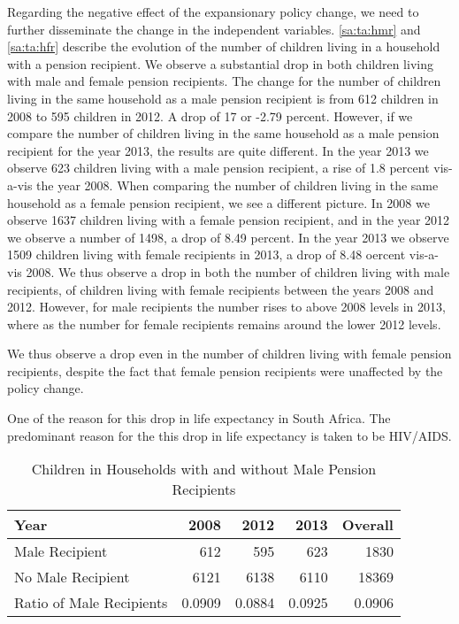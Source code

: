 \begin{refsection}
Regarding the negative effect of the expansionary policy change, we need to further disseminate the change in the independent variables.
\autoref{sa:ta:hmr} and \autoref{sa:ta:hfr} describe the evolution of the number of children living in a household with a pension recipient.
We observe a substantial drop in both children living with male and female pension recipients.
The change for the number of children living in the same household as a male pension recipient is from 612 children in 2008 to 595 children in 2012. A drop of 17 or -2.79 percent.
However, if we compare the number of children living in the same household as a male pension recipient for the year 2013,
the results are quite different.
In the year 2013 we observe 623 children living with a male pension recipient, a rise of 1.8 percent vis-a-vis the year 2008.
When comparing the number of children living in the same household as a female pension recipient, we see a different picture.
In 2008 we observe 1637 children living with a female pension recipient,
and in the year 2012 we observe a number of 1498, a drop of 8.49 percent.
In the year 2013 we observe 1509 children living with female recipients in 2013,
a drop of 8.48 oercent vis-a-vis 2008.
We thus observe a drop in both the number of children living with male recipients,
of children living with female recipients between the years 2008 and 2012.
However, for male recipients the number rises to above 2008 levels in 2013,
where as the number for female recipients remains around the lower 2012 levels.

We thus observe a drop even in the number of children living with female pension recipients,
despite the fact that female pension recipients were unaffected by the policy change.

One of the reason for this drop in life expectancy in South Africa.
The predominant reason for the this drop in life expectancy is taken to be HIV/AIDS.


\begin{table}[ht!]
\centering
\caption{Children in Households with and without Male Pension Recipients}
\label{sa:ta:hmr}
    \begin{tabular}{l|rrrr}
    \hline
    Year              & 2008   & 2012   & 2013   & Overall \\
    \hline
    Male Recipient    & 612    & 595    & 623    & 1830    \\
    No Male Recipient & 6121   & 6138   & 6110   & 18369   \\
    Ratio of Male Recipients & 0.0909 & 0.0884 & 0.0925 & 0.0906  \\
    \end{tabular}
\end{table}


\end{refsection}
